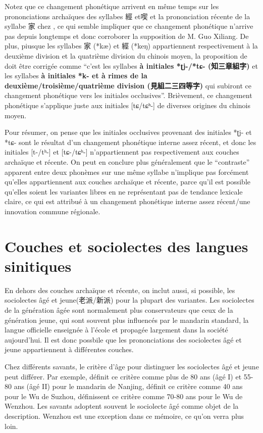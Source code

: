 \documentclass{scrbook}
\newcounter{c}[subsubsection]
\newcommand{\difwenbai}{couches archaïque et récente\xspace}
\newcommand{\diflaoxin}{sociolectes âgé et jeune\xspace}
\newcommand{\termyyx}[1]{\textbf{#1}}
\begin{document}
\begin{sloppypar}
Notez que ce changement phonétique arrivent en même temps sur les prononciations archaïques des syllabes 經 et喫 et la prononciation récente de la syllabe 家 chez \textcite{Chen2006xiang}, ce qui semble impliquer que ce changement phonétique n'arrive pas depuis longtemps et donc corroborer la supposition de M. Guo Xiliang. De plus, piusque les syllabes 家 (*kæ) et 經 (*keŋ) appartiennent respectivement à la deuxième division et la quatrième division du chinois moyen, la proposition de \textcite[12]{Yan1994Loudi} doit être corrigée comme ``c'est les syllabes \termyyx{à initiales *ʈj-/*tɕ- (知三章組字)} et les syllabes \termyyx{à initiales *k- et à rimes de la deuxième/troisième/quatrième division (見組二三四等字)} qui subiront ce changement phonétique vers les initiales occlusives''. Brièvement, ce changement phonétique s'applique juste aux initiales [tɕ/tɕʰ-] de diverses origines du chinois moyen.

Pour résumer, on pense que les initiales occlusives provenant des initiales *ʈj- et *tɕ- sont le résultat d'un changement phonétique interne assez récent, et donc les initiales [t-/tʰ-] et [tɕ-/tɕʰ-] n'appartiennent pas respectivement aux \difwenbai. On peut en conclure plus généralement que le ``contraste'' apparent entre deux phonèmes sur une même syllabe n'implique pas forcément qu'elles appartiennent aux \difwenbai, parce qu'il est possible qu'elles soient les variantes libres en ne représentant pas de tendance lexicale claire, ce qui est attribué à un changement phonétique interne assez récent/une innovation commune régionale.

\chapter{Couches et sociolectes des langues sinitiques}\label{couche_dialect}
En dehors des \difwenbai, on inclut aussi, si possible, les \diflaoxin (老派/新派) pour la plupart des variantes. Les sociolectes de la génération âgée sont normalement plus conservateurs que ceux de la génération jeune, qui sont souvent plus influencés par le mandarin standard, la langue officielle enseignée à l'école et propagée largement dans la société aujourd'hui. Il est donc possbile que les prononciations des \diflaoxin appartiennent à différentes couches.

Chez différents savants, le critère d'âge pour distinguer les \diflaoxin peut différer. Par exemple, \textcite[5]{Liu1995Nanjing} définit ce critère comme plus de 80 ans (âgé I) et 55-80 ans (âgé II) pour le mandarin de Nanjing, \textcite[4]{Ye1993Suzhou} définit ce critère comme 40 ans pour le Wu de Suzhou, \textcite[6]{You1998Wenzhou} définissent ce critère comme 70-80 ans pour le Wu de Wenzhou. Les savants adoptent souvent le sociolecte âgé comme objet de la description. Wenzhou est une exception dans ce mémoire, ce qu'on verra plus loin.


\end{sloppypar}
\end{document}
